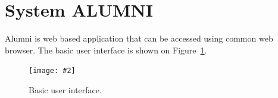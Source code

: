 \documentclass{iitsrc}[2006/14/02]
\newcommand\fig[4]{%
	\begin{figure}[h]
	\begin{center}
	\texttt{[image: \#2]}
	~\\%
	\caption{#4}
	\label{#3}
	\end{center}
	\end{figure}
}
\begin{document}



\section{System ALUMNI}

Alumni is web based application that can be accessed using common web browser. The basic user interface is shown on Figure~\ref{fig:scr1}. 

\fig{width=12cm, bb = 0 0 831 683}{images/screen1.png}{fig:scr1}{Basic user interface.}
\end{document}
